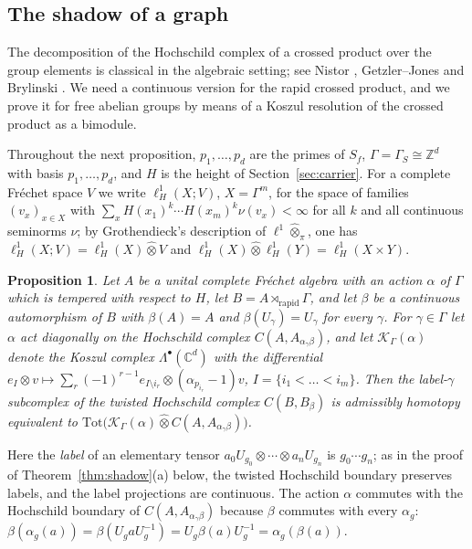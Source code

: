 \documentclass[11pt]{amsart}
\newtheorem{proposition}[theorem]{Proposition}
\theoremstyle{definition}
\theoremstyle{remark}
\newcommand{\C}{\mathbb C}
\newcommand{\Z}{\mathbb Z}
\begin{document}
\subsection{The shadow of a graph}

The decomposition of the Hochschild complex of a crossed product over the
group elements is classical in the algebraic setting; see Nistor
\cite[\S\S3--4]{Nistor}, Getzler--Jones \cite[\S3]{GetzlerJones} and
Brylinski \cite{Brylinski}.  We need a continuous version for the rapid
crossed product, and we prove it for free abelian groups by means of a
Koszul resolution of the crossed product as a bimodule.

Throughout the next proposition, $p_1,\dots,p_d$ are the primes of $S_f$,
$\Gamma=\Gamma_S\cong\Z^{d}$ with basis $p_1,\dots,p_d$, and $H$ is the height
of Section~\ref{sec:carrier}.  For a complete Fr\'echet space $V$ we write
$\ell^{1}_{H}(X;V)$, $X=\Gamma^{m}$, for the space of families
$(v_x)_{x\in X}$ with $\sum_xH(x_1)^{k}\cdots H(x_m)^{k}\nu(v_x)<\infty$ for all
$k$ and all continuous seminorms $\nu$; by Grothendieck's description of
$\ell^{1}\widehat\otimes_{\pi}$, one has
$\ell^{1}_{H}(X;V)=\ell^{1}_{H}(X)\widehat\otimes V$ and
$\ell^{1}_{H}(X)\widehat\otimes\ell^{1}_{H}(Y)=\ell^{1}_{H}(X\times Y)$.

\begin{proposition}\label{prop:crossed}
Let $A$ be a unital complete Fr\'echet algebra with an action $\alpha$ of
$\Gamma$ which is tempered with respect to $H$, let
$B=A\rtimes_{\mathrm{rapid}}\Gamma$, and let $\beta$ be a continuous
automorphism of $B$ with $\beta(A)=A$ and $\beta(U_{\gamma})=U_{\gamma}$ for
every $\gamma$.  For $\gamma\in\Gamma$ let $\alpha$ act diagonally on the
Hochschild complex $C(A,A_{\alpha_{\gamma}\beta})$, and let
$\mathcal K_{\Gamma}(\alpha)$ denote the Koszul complex
$\Lambda^{\bullet}(\C^{d})$ with the differential
$e_I\otimes v\mapsto\sum_{r}(-1)^{r-1}e_{I\setminus i_r}\otimes
(\alpha_{p_{i_r}}-1)v$, $I=\{i_1<\dots<i_m\}$.  Then the label-$\gamma$
subcomplex of the twisted Hochschild complex $C(B,B_{\beta})$ is
admissibly homotopy equivalent to
$\mathrm{Tot}\bigl(\mathcal K_{\Gamma}(\alpha)\widehat\otimes
C(A,A_{\alpha_{\gamma}\beta})\bigr)$.
\end{proposition}

Here the \emph{label} of an elementary tensor $a_0U_{g_0}\otimes\cdots\otimes
a_nU_{g_n}$ is $g_0\cdots g_n$; as in the proof of Theorem~\ref{thm:shadow}(a)
below, the twisted Hochschild boundary preserves labels, and the label
projections are continuous.  The action $\alpha$ commutes with the
Hochschild boundary of $C(A,A_{\alpha_{\gamma}\beta})$ because $\beta$
commutes with every $\alpha_g$: $\beta(\alpha_g(a))=\beta(U_gaU_g^{-1})=
U_g\beta(a)U_g^{-1}=\alpha_g(\beta(a))$.
\end{document}
